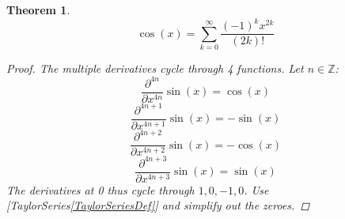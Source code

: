 \documentclass[]{article}
\newcommand{\pqty}[1]{{\left(#1\right)}}
\newcommand{\pdiff}[2]{\frac{\partial^{#2}}{\partial #1^{#2}}}
\newtheorem{theorem}{Theorem}[section]
\numberwithin{equation}{section}
\begin{document}
	\begin{theorem}
		\begin{equation}
		\label{CosTaylor}
		\cos\pqty{x}=\sum_{k=0}^{\infty} \frac{\pqty{-1}^kx^{2k}}{\pqty{2k}!}
		\end{equation}
		\begin{proof}
			The multiple derivatives cycle through 4 functions. Let \(n\in\mathbb{Z}\):
			\begin{equation}
			\pdiff{x}{4n}\sin\pqty{x}=\cos\pqty{x}
			\end{equation}
			\begin{equation}
			\pdiff{x}{4n+1}\sin\pqty{x}=-\sin\pqty{x}
			\end{equation}
			\begin{equation}
			\pdiff{x}{4n+2}\sin\pqty{x}=-\cos\pqty{x}
			\end{equation}
			\begin{equation}
			\pdiff{x}{4n+3}\sin\pqty{x}=\sin\pqty{x}
			\end{equation}
			The derivatives at 0 thus cycle through \(1,0,-1,0\). Use [TaylorSeries\eqref{TaylorSeriesDef}] and simplify out the zeroes.
		\end{proof}
	\end{theorem}
\end{document}
